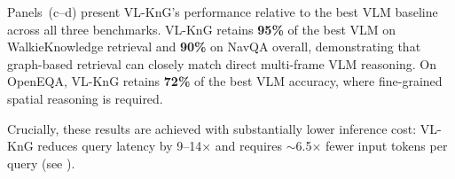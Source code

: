 Panels~(c--d) present VL-KnG's performance relative to the best VLM baseline across all three benchmarks.
VL-KnG retains \textbf{95\%} of the best VLM on WalkieKnowledge retrieval and \textbf{90\%} on NavQA overall, demonstrating that graph-based retrieval can closely match direct multi-frame VLM reasoning.
On OpenEQA, VL-KnG retains \textbf{72\%} of the best VLM accuracy, where fine-grained spatial reasoning is required.

Crucially, these results are achieved with substantially lower inference cost: VL-KnG reduces query latency by 9--14$\times$ and requires ${\sim}$6.5$\times$ fewer input tokens per query (see ).






